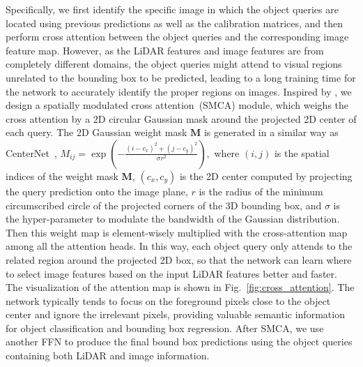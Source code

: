 Specifically, we first {identify} the specific image {in which the object queries are located} 
using previous predictions as well as the calibration matrices, and then perform cross attention between {the} object queries and the corresponding image feature map.
However, as the LiDAR features and image features are from completely different domains, the object queries might attend to visual regions unrelated to the bounding box to be predicted, leading to a long training time for the network to accurately identify the proper regions on images. Inspired by \cite{Gao2021FastCO}, we design a spatially
modulated cross attention~(SMCA) module{,} which weighs the cross attention by a 2D circular Gaussian mask around the projected 2D center of each query. The 2D Gaussian {weight} mask $\mathbf{M}$ is generated in a similar way as CenterNet~\cite{Zhou2019ObjectsAP},
$M_{ij} = \exp(-\frac{(i-c_x)^2 + (j-c_y)^2}{\sigma r^2}),$
where $(i,j)$ is the spatial indices of the weight mask $\mathbf{M}$, $(c_x, c_y)$ is the 2D center computed by projecting the query prediction 
onto the image plane, $r$ is the radius of the minimum circumscribed circle
of the projected corners of the 3D bounding box, and $\sigma$ is the hyper-parameter to modulate the bandwidth of the Gaussian distribution. 
Then this weight map is element-wisely multiplied with the cross-attention map among all the {attention} heads.
In this way, each object query only attends to the related region around the projected 2D box, so that the network can learn where to select image features based on the input LiDAR features better and faster. The visualization of the attention map is shown in Fig.~\ref{fig:cross_attention}. The network typically tends to focus on the foreground pixels close to the object center and ignore the irrelevant pixels, providing valuable semantic information for {object classification and bounding box regression.}
After SMCA, we use another FFN to produce the final bound box predictions using the object queries containing both LiDAR and image information.









